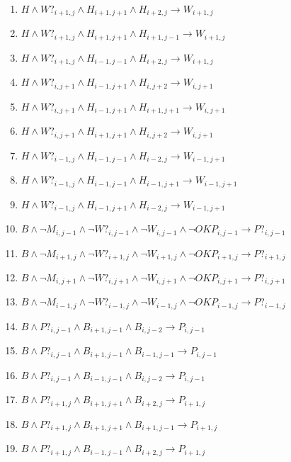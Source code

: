 \begin{enumerate}
    \item $H \land W?_{i+1, j} \land H_{i+1, j+1} \land H_{i+2, j} \longrightarrow W_{i+1, j}$
    \item $H \land W?_{i+1, j} \land H_{i+1, j+1} \land H_{i+1, j-1} \longrightarrow W_{i+1, j}$
    \item $H \land W?_{i+1, j} \land H_{i-1, j-1} \land H_{i+2, j} \longrightarrow W_{i+1, j}$
    
    \item $H \land W?_{i, j+1} \land H_{i-1, j+1} \land H_{i, j+2} \longrightarrow W_{i, j+1}$
    \item $H \land W?_{i, j+1} \land H_{i-1, j+1} \land H_{i+1, j+1} \longrightarrow W_{i, j+1}$
    \item $H \land W?_{i, j+1} \land H_{i+1, j+1} \land H_{i, j+2} \longrightarrow W_{i, j+1}$
    
    \item $H \land W?_{i-1, j} \land H_{i-1, j-1} \land H_{i-2, j} \longrightarrow W_{i-1, j+1}$
    \item $H \land W?_{i-1, j} \land H_{i-1, j-1} \land H_{i-1, j+1} \longrightarrow W_{i-1, j+1}$
    \item $H \land W?_{i-1, j} \land H_{i-1, j+1} \land H_{i-2, j} \longrightarrow W_{i-1, j+1}$
    
    \item $B \land \neg M_{i, j-1} \land \neg W?_{i, j-1} \land \neg W_{i, j-1} \land \neg OKP_{i, j-1} \longrightarrow P?_{i, j-1}$
    \item $B \land \neg M_{i+1, j} \land \neg W?_{i+1, j} \land \neg W_{i+1, j} \land \neg OKP_{i+1, j} \longrightarrow P?_{i+1, j}$
    \item $B \land \neg M_{i, j+1} \land \neg W?_{i, j+1} \land \neg W_{i, j+1} \land \neg OKP_{i, j+1} \longrightarrow P?_{i, j+1}$
    \item $B \land \neg M_{i-1, j} \land \neg W?_{i-1, j} \land \neg W_{i-1, j} \land \neg OKP_{i-1, j} \longrightarrow P?_{i-1, j}$
    \item $B \land P?_{i, j-1} \land B_{i+1, j-1} \land B_{i, j-2} \longrightarrow P_{i, j-1}$
    \item $B \land P?_{i, j-1} \land B_{i+1, j-1} \land B_{i-1, j-1} \longrightarrow P_{i, j-1}$
    \item $B \land P?_{i, j-1} \land B_{i-1, j-1} \land B_{i, j-2} \longrightarrow P_{i, j-1}$
    
    \item $B \land P?_{i+1, j} \land B_{i+1, j+1} \land B_{i+2, j} \longrightarrow P_{i+1, j}$
    \item $B \land P?_{i+1, j} \land B_{i+1, j+1} \land B_{i+1, j-1} \longrightarrow P_{i+1, j}$
    \item $B \land P?_{i+1, j} \land B_{i-1, j-1} \land B_{i+2, j} \longrightarrow P_{i+1, j}$
    

\end{enumerate}
